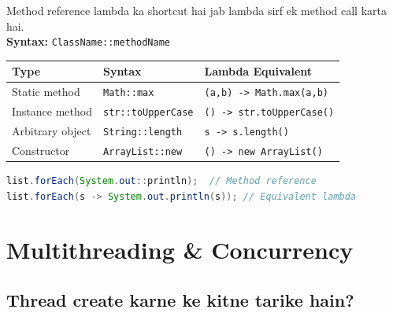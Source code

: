 \documentclass[12pt,a4paper]{article}
\begin{document}
\begin{answerbox}
Method reference lambda ka shortcut hai jab lambda sirf ek method call karta hai.\\[5pt]
\textbf{Syntax:} \texttt{ClassName::methodName}
\begin{center}
\begin{tabular}{l l l}
\toprule
\textbf{Type} & \textbf{Syntax} & \textbf{Lambda Equivalent} \\
\midrule
Static method & \texttt{Math::max} & \texttt{(a,b) -> Math.max(a,b)} \\
Instance method & \texttt{str::toUpperCase} & \texttt{() -> str.toUpperCase()} \\
Arbitrary object & \texttt{String::length} & \texttt{s -> s.length()} \\
Constructor & \texttt{ArrayList::new} & \texttt{() -> new ArrayList()} \\
\bottomrule
\end{tabular}
\end{center}
\begin{lstlisting}[language=Java]
list.forEach(System.out::println);  // Method reference
list.forEach(s -> System.out.println(s)); // Equivalent lambda
\end{lstlisting}
\end{answerbox}

\section{Multithreading \& Concurrency}

\setcounter{subsection}{52}

\subsection{Thread create karne ke kitne tarike hain?}
\end{document}
